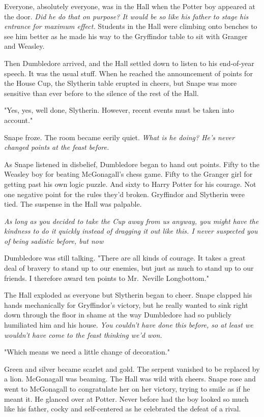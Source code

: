 Everyone, absolutely everyone, was in the Hall when the Potter boy appeared at the door. \emph{Did he do that on purpose? It would be so like his father to stage his entrance for maximum effect.} Students in the Hall were climbing onto benches to see him better as he made his way to the Gryffindor table to sit with Granger and Weasley.

Then Dumbledore arrived, and the Hall settled down to listen to his end-of-year speech. It was the usual stuff. When he reached the announcement of points for the House Cup, the Slytherin table erupted in cheers, but Snape was more sensitive than ever before to the silence of the rest of the Hall.

"Yes, yes, well done, Slytherin. However, recent events must be taken into account."

Snape froze. The room became eerily quiet. \emph{What is he doing? He's never changed points at the feast before.}

As Snape listened in disbelief, Dumbledore began to hand out points. Fifty to the Weasley boy for beating McGonagall's chess game. Fifty to the Granger girl for getting past his own logic puzzle. And sixty to Harry Potter for his courage. Not one negative point for the rules they'd broken. Gryffindor and Slytherin were tied. The suspense in the Hall was palpable.

\emph{As long as you decided to take the Cup away from us anyway, you might have the kindness to do it quickly instead of dragging it out like this. I never suspected you of being sadistic before, but now{\el}}

Dumbledore was still talking. "There are all kinds of courage. It takes a great deal of bravery to stand up to our enemies, but just as much to stand up to our friends. I therefore award ten points to Mr.~Neville Longbottom."

The Hall exploded as everyone but Slytherin began to cheer. Snape clapped his hands mechanically for Gryffindor's victory, but he really wanted to sink right down through the floor in shame at the way Dumbledore had so publicly humiliated him and his house. \emph{You couldn't have done this before, so at least we wouldn't have come to the feast thinking we'd won.}

"Which means we need a little change of decoration."

Green and silver became scarlet and gold. The serpent vanished to be replaced by a lion. McGonagall was beaming. The Hall was wild with cheers. Snape rose and went to McGonagall to congratulate her on her victory, trying to smile as if he meant it. He glanced over at Potter. Never before had the boy looked so much like his father, cocky and self-centered as he celebrated the defeat of a rival.

